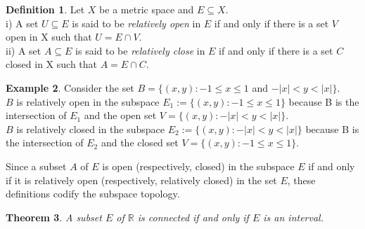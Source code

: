 \documentclass[12pt, reqno]{amsart}
\newtheorem{theorem}{Theorem}[section]
\theoremstyle{definition}
\newtheorem{definition}[theorem]{Definition}
\newtheorem{example}[theorem]{Example}
\numberwithin{equation}{section}
\newcommand{\dR}{{\mathbb R}}
\begin{document}
\begin{definition}\cite{s1}
    Let $X$ be a metric space and $E \subseteq X$.\\
    i) A set $U \subseteq E$ is said to be \textit{relatively open} in $E$ if and only if there is a set $V$ open in X such that $U = E \cap V$.\\
    ii) A set $A \subseteq E$ is said to be \textit{relatively close} in $E$ if and only if there is a set $C$ closed in X such that $A = E \cap C$.
\end{definition}
\begin{example}
Consider the set $B=\{(x,y):-1 \leq x \leq 1$ and $-|x| < y < |x| \}$.\\
$B$ is relatively open in the subspace $E_1 := \{(x,y):-1 \leq x \leq 1\}$ because B is the intersection of $E_1$ and the open set $V=\{(x,y):-|x| < y < |x| \}$.\\
$B$ is relatively closed in the subspace $E_2 := \{(x,y):-|x| < y < |x| \}$ because B is the intersection of $E_2$ and the closed set $V=\{(x,y):-1 \leq x \leq 1 \}$.
\end{example}
Since a subset $A$ of $E$ is open (respectively, closed) in the subspace $E$ if and only if it is relatively open (respectively, relatively closed) in the set $E$, these definitions codify the subspace topology.\\
\begin{theorem}\cite{s1}
    A subset $E$ of $\dR$ is connected if and only if $E$ is an interval.
\end{theorem}
\end{document}
